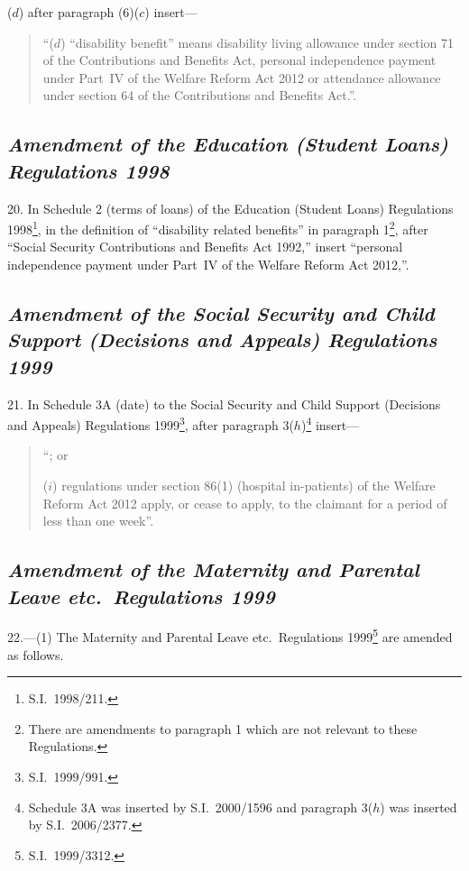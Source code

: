 \documentclass[12pt,a4paper]{article}
\begin{document}
\begin{enumerate}
($d$) after paragraph (6)($c$)  insert—
\begin{quotation}
“($d$) “disability benefit” means disability living allowance under section 71 of the Contributions and Benefits Act, personal independence payment under Part~IV of the Welfare Reform Act 2012 or attendance allowance under section 64 of the Contributions and Benefits Act.”.
\end{quotation}
\end{enumerate}

\subsection*{\itshape Amendment of the Education (Student Loans) Regulations 1998}

20.  In Schedule 2 (terms of loans) of the Education (Student Loans) Regulations 1998\footnote{S.I.~1998/211.}, in the definition of “disability related benefits” in paragraph 1\footnote{There are amendments to paragraph 1 which are not relevant to these Regulations.}, after “Social Security Contributions and Benefits Act 1992,” insert “personal independence payment under Part~IV of the Welfare Reform Act 2012,”.

\subsection*{\itshape Amendment of the Social Security and Child Support (Decisions and Appeals) Regulations 1999}

21.  In Schedule 3A (date) to the Social Security and Child Support (Decisions and Appeals) Regulations 1999\footnote{S.I.~1999/991.}, after paragraph 3($h$)\footnote{Schedule 3A was inserted by S.I.~2000/1596 and paragraph 3($h$)  was inserted by S.I.~2006/2377.} insert—
\begin{quotation}
“; or

($i$) regulations under section 86(1) (hospital in-patients) of the Welfare Reform Act 2012 apply, or cease to apply, to the claimant for a period of less than one week”.
\end{quotation}

\subsection*{\itshape Amendment of the Maternity and Parental Leave etc.\ Regulations 1999}

22.—(1) The Maternity and Parental Leave etc.\ Regulations 1999\footnote{S.I.~1999/3312.} are amended as follows.
\end{document}
